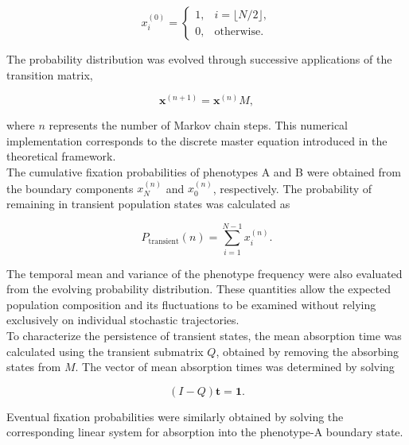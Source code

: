 \begin{equation}
x_i^{(0)}
=
\begin{cases}
1, & i=\lfloor N/2\rfloor,\\
0, & \text{otherwise}.
\end{cases}
\label{eq:initial_markov_distribution}
\end{equation}

The probability distribution was evolved through successive applications of the transition matrix,

\begin{equation}
\mathbf{x}^{(n+1)}
=
\mathbf{x}^{(n)}M,
\label{eq:method_markov_evolution}
\end{equation}

where \(n\) represents the number of Markov chain steps. This numerical implementation corresponds to the discrete master equation introduced in the theoretical framework. \\ 

The cumulative fixation probabilities of phenotypes A and B were obtained from the boundary components \(x_N^{(n)}\) and \(x_0^{(n)}\), respectively. The probability of remaining in transient population states was calculated as 

\begin{equation}
P_{\mathrm{transient}}(n)
=
\sum_{i=1}^{N-1}x_i^{(n)}.
\label{eq:method_transient_probability}
\end{equation}

The temporal mean and variance of the phenotype frequency were also evaluated from the evolving probability distribution. These quantities allow the expected population composition and its fluctuations to be examined without relying exclusively on individual stochastic trajectories. \\

To characterize the persistence of transient states, the mean absorption time was calculated using the transient submatrix \(Q\), obtained by removing the absorbing states from \(M\). The vector of mean absorption times was determined by solving

\begin{equation}
(I-Q)\mathbf{t}=\mathbf{1}.
\label{eq:method_mean_absorption}
\end{equation}

Eventual fixation probabilities were similarly obtained by solving the corresponding linear system for absorption into the phenotype-A boundary state. \\ 

